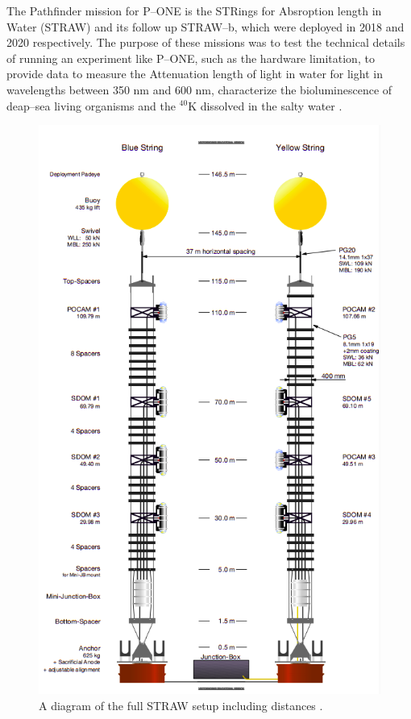 The Pathfinder mission for P--ONE is the STRings for Absroption length in Water (STRAW) and its follow up STRAW--b, which were deployed in 2018 and 2020 respectively. The purpose of these missions was to test the technical details of running an experiment like P--ONE, such as the hardware limitation, to provide data to measure the Attenuation length of light in water for light in wavelengths between 350 nm and 600 nm, characterize the bioluminescence of deap--sea living organisms and the $^{40}$K dissolved in the salty water \cite{straw}.

\begin{figure}[H]
  \centering
  \includegraphics[width=.7\textwidth]{./Figures/STRAW.png}
  \caption{A diagram of the full STRAW setup including distances \cite{straw}.}
  \label{fig:straw}
\end{figure}

